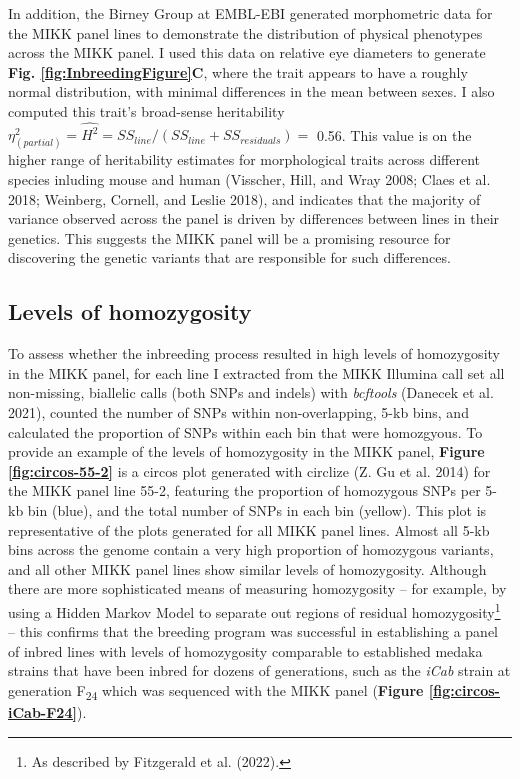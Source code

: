\documentclass[
]{book}
\begin{document}
In addition, the Birney Group at EMBL-EBI generated morphometric data for the MIKK panel lines to demonstrate the distribution of physical phenotypes across the MIKK panel. I used this data on relative eye diameters to generate \textbf{Fig. \ref{fig:InbreedingFigure}C}, where the trait appears to have a roughly normal distribution, with minimal differences in the mean between sexes. I also computed this trait's broad-sense heritability \(\eta^2_{(partial)} = \hat{H^2} = SS_{line} / (SS_{line} + SS_{residuals}) =\) 0.56. This value is on the higher range of heritability estimates for morphological traits across different species inluding mouse and human (Visscher, Hill, and Wray 2008; Claes et al. 2018; Weinberg, Cornell, and Leslie 2018), and indicates that the majority of variance observed across the panel is driven by differences between lines in their genetics. This suggests the MIKK panel will be a promising resource for discovering the genetic variants that are responsible for such differences.

\hypertarget{levels-of-homozygosity}{%
\subsection{Levels of homozygosity}\label{levels-of-homozygosity}}

To assess whether the inbreeding process resulted in high levels of homozygosity in the MIKK panel, for each line I extracted from the MIKK Illumina call set all non-missing, biallelic calls (both SNPs and indels) with \emph{bcftools} (Danecek et al. 2021), counted the number of SNPs within non-overlapping, 5-kb bins, and calculated the proportion of SNPs within each bin that were homozgyous. To provide an example of the levels of homozygosity in the MIKK panel, \textbf{Figure \ref{fig:circos-55-2}} is a circos plot generated with circlize (Z. Gu et al. 2014) for the MIKK panel line 55-2, featuring the proportion of homozygous SNPs per 5-kb bin (blue), and the total number of SNPs in each bin (yellow). This plot is representative of the plots generated for all MIKK panel lines. Almost all 5-kb bins across the genome contain a very high proportion of homozygous variants, and all other MIKK panel lines show similar levels of homozygosity. Although there are more sophisticated means of measuring homozygosity -- for example, by using a Hidden Markov Model to separate out regions of residual homozygosity\footnote{As described by Fitzgerald et al. (2022).} -- this confirms that the breeding program was successful in establishing a panel of inbred lines with levels of homozygosity comparable to established medaka strains that have been inbred for dozens of generations, such as the \emph{iCab} strain at generation F\textsubscript{24} which was sequenced with the MIKK panel (\textbf{Figure \ref{fig:circos-iCab-F24}}).
\end{document}
